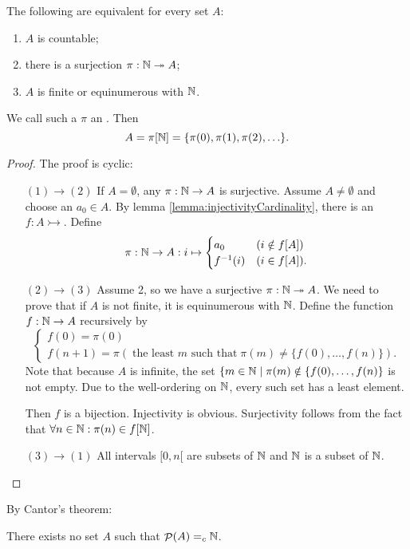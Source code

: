 \begin{proposition}
The following are equivalent for every set $A$:
\begin{enumerate}
\item $A$ is countable;
\item there is a surjection $\pi:\mathbb{N}\twoheadrightarrow A$;
\item $A$ is finite or equinumerous with $\mathbb{N}$.
\end{enumerate}
We call such a $\pi$ an . Then
\[ A = \pi[\mathbb{N}] = \{\pi(0),\pi(1),\pi(2),\ldots \}. \]
\end{proposition}
\begin{proof}
The proof is cyclic:
\begin{enumerate}[leftmargin=2cm]
\item[$\boxed{(1)\rightarrow (2)}$] If $A = \emptyset$, any $\pi:\mathbb{N}\to A$ is surjective. Assume $A\neq \emptyset$ and choose an $a_0\in A$. By lemma \ref{lemma:injectivityCardinality}, there is an $f:A\rightarrowtail$. Define
\[ \pi: \mathbb{N}\to A: i\mapsto \begin{cases}
a_0 & (i\notin f[A]) \\ f^{-1}(i) & (i\in f[A]).
\end{cases} \]
\item[$\boxed{(2)\rightarrow (3)}$] Assume 2, so we have a surjective $\pi:\mathbb{N}\twoheadrightarrow A$. We need to prove that if $A$ is not finite, it is equinumerous with $\mathbb{N}$. Define the function $f:\mathbb{N}\to A$ recursively by
\[ \begin{cases}
f(0) = \pi(0) \\
f(n+1) = \pi\left(\;\text{the least $m$ such that}\; \pi(m)\neq \{f(0),\ldots,f(n)\}\right).
\end{cases} \]
Note that because $A$ is infinite, the set $\{ m\in\mathbb{N}\;|\; \pi(m)\notin \{ f(0),\ldots,f(n) \}$ is not empty. Due to the well-ordering on $\mathbb{N}$, every such set has a least element.

Then $f$ is a bijection. Injectivity is obvious. Surjectivity follows from the fact that $\forall n\in \mathbb{N}: \pi(n)\in f[\mathbb{N}]$.
\item[$\boxed{(3)\rightarrow (1)}$] All intervals $[0, n[$ are subsets of $\mathbb{N}$ and $\mathbb{N}$ is a subset of $\mathbb{N}$.
\end{enumerate}
\end{proof}
By Cantor's theorem:
\begin{corollary}
There exists no set $A$ such that $\mathop{\mathcal{P}}(A) =_c \mathbb{N}$.
\end{corollary}

